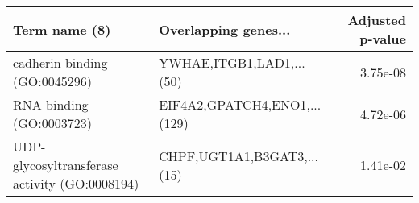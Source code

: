 \begin{tabular}{llr}
\toprule
                                Term name (8) &         Overlapping genes... &  Adjusted p-value \\
\midrule
                cadherin binding (GO:0045296) &     YWHAE,ITGB1,LAD1,...(50) &          3.75e-08 \\
                     RNA binding (GO:0003723) & EIF4A2,GPATCH4,ENO1,...(129) &          4.72e-06 \\
UDP-glycosyltransferase activity (GO:0008194) &   CHPF,UGT1A1,B3GAT3,...(15) &          1.41e-02 \\
\bottomrule
\end{tabular}
